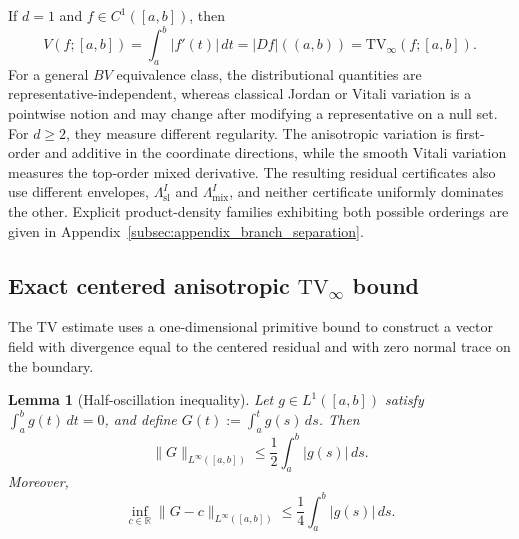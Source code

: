 \documentclass[11pt,letterpaper]{article}
\newtheorem{lemma}[theorem]{Lemma}
\theoremstyle{definition}
\theoremstyle{remark}
\newcommand{\TV}{\mathrm{TV}}
\begin{document}
If $d=1$ and $f\in C^1([a,b])$, then
$$
V(f;[a,b])
=
\int_a^b|f'(t)|\,dt
=
|Df|((a,b))
=
\TV_\infty(f;[a,b]).
$$
For a general $BV$ equivalence class, the distributional quantities are
representative-independent, whereas classical Jordan or Vitali variation is
a pointwise notion and may change after modifying a representative on a null
set. For $d\ge2$, they measure
different regularity. The anisotropic variation is first-order and additive in
the coordinate directions, while the smooth Vitali variation measures the
top-order mixed derivative. The resulting residual certificates also use
different envelopes, $\Lambda_{\mathrm{sl}}^I$ and
$\Lambda_{\mathrm{mix}}^I$, and neither certificate uniformly dominates the
other. Explicit product-density families exhibiting both possible orderings
are given in Appendix~\ref{subsec:appendix_branch_separation}.

  
\subsection{Exact centered anisotropic \texorpdfstring{$\TV_\infty$}{TV-infinity} bound } 
\label{subsec:exact_centered_tv_bounds}
  

The TV estimate uses a one-dimensional primitive bound to construct a vector
field with divergence equal to the centered residual and with zero normal trace
on the boundary.

\begin{lemma}[Half-oscillation inequality]
\label{lem:half_oscillation}
Let $g\in L^1([a,b])$ satisfy $\int_a^b g(t)\,dt=0$, and define
$G(t):=\int_a^t g(s)\,ds$. Then
\begin{equation}
\label{eq:half_oscillation}
\|G\|_{L^\infty([a,b])}
\le
\frac12\int_a^b |g(s)|\,ds.
\end{equation}
Moreover,
\begin{equation}
\label{eq:recentered_half_oscillation}
\inf_{c\in\mathbb R}\|G-c\|_{L^\infty([a,b])}
\le
\frac14\int_a^b |g(s)|\,ds.
\end{equation}
\end{lemma}
\end{document}
